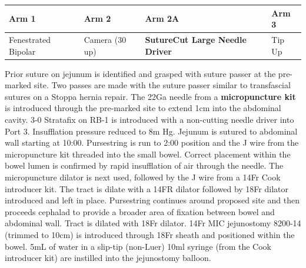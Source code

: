 \documentclass[
  letterpaper,
]{scrbook}
\begin{document}
\begin{longtable}[]{@{}
  >{\raggedright\arraybackslash}p{}
  >{\raggedright\arraybackslash}p{}
  >{\raggedright\arraybackslash}p{}
  >{\raggedright\arraybackslash}p{}@{}}
\toprule\noalign{}
\begin{minipage}[b]{\linewidth}\raggedright
Arm 1
\end{minipage} & \begin{minipage}[b]{\linewidth}\raggedright
Arm 2
\end{minipage} & \begin{minipage}[b]{\linewidth}\raggedright
Arm 2A
\end{minipage} & \begin{minipage}[b]{\linewidth}\raggedright
Arm 3
\end{minipage} \\
\midrule\noalign{}
\endhead
\bottomrule\noalign{}
\endlastfoot
Fenestrated Bipolar & Camera (30 up) & \textbf{SutureCut Large Needle
Driver} & Tip Up \\
\end{longtable}

Prior suture on jejunum is identified and grasped with suture passer at
the pre-marked site. Two passes are made with the suture passer similar
to transfascial sutures on a Stoppa hernia repair. The 22Ga needle from
a \textbf{micropuncture kit} is introduced through the pre-marked site
to extend 1cm into the abdominal cavity. 3-0 Stratafix on RB-1 is
introduced with a non-cutting needle driver into Port 3. Insufflation
pressure reduced to 8m Hg. Jejunum is sutured to abdominal wall starting
at 10:00. Pursestring is run to 2:00 position and the J wire from the
micropuncture kit threaded into the small bowel. Correct placement
within the bowel lumen is confirmed by rapid insufflation of air through
the needle. The micropuncture dilator is next used, followed by the J
wire from a 14Fr Cook introducer kit. The tract is dilate with a 14FR
dilator followed by 18Fr dilator introduced and left in place.
Pursestring continues around proposed site and then proceeds cephalad to
provide a broader area of fixation between bowel and abdominal wall.
Tract is dilated with 18Fr dilator. 14Fr MIC jejunostomy 8200-14
(trimmed to 10cm) is introduced through 18Fr sheath and positioned
within the bowel. 5mL of water in a slip-tip (non-Luer) 10ml syringe
(from the Cook introducer kit) are instilled into the jejunostomy
balloon.
\end{document}
